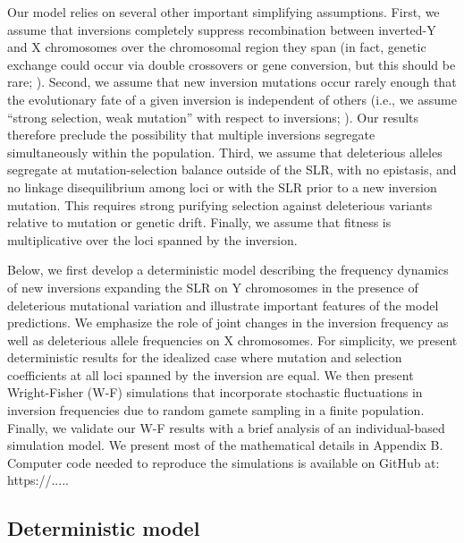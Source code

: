 \documentclass[11pt]{article}
\begin{document}
Our model relies on several other important simplifying assumptions. First, we assume that inversions completely suppress recombination between inverted-Y and X chromosomes over the chromosomal region they span (in fact, genetic exchange could occur via double crossovers or gene conversion, but this should be rare; \citealt{KrimbasPowell1992,KorunesNoor2019}). Second, we assume that new inversion mutations occur rarely enough that the evolutionary fate of a given inversion is independent of others (i.e., we assume “strong selection, weak mutation” with respect to inversions; \citealt{Gillespie1991}). Our results therefore preclude the possibility that multiple inversions segregate simultaneously within the population. Third, we assume that deleterious alleles segregate at mutation-selection balance outside of the SLR, with no epistasis, and no linkage disequilibrium among loci or with the SLR prior to a new inversion mutation. This requires strong purifying selection against deleterious variants relative to mutation or genetic drift. Finally, we assume that fitness is multiplicative over the loci spanned by the inversion.

Below, we first develop a deterministic model describing the frequency dynamics of new inversions expanding the SLR on Y chromosomes in the presence of deleterious mutational variation and illustrate important features of the model predictions. We emphasize the role of joint changes in the inversion frequency as well as deleterious allele frequencies on X chromosomes. For simplicity, we present deterministic results for the idealized case where mutation and selection coefficients at all loci spanned by the inversion are equal. We then present Wright-Fisher (W-F) simulations that incorporate stochastic fluctuations in inversion frequencies due to random gamete sampling in a finite population. Finally, we validate our W-F results with a brief analysis of an individual-based simulation model. We present most of the mathematical details in Appendix B. Computer code needed to reproduce the simulations is available on GitHub at: https://.....

\subsection*{Deterministic model}
\end{document}

